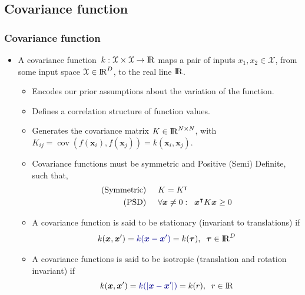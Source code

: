 \documentclass[8pt]{beamer} %
\DeclareMathOperator{\cov}{cov}
\begin{document}
\subsection*{Covariance function}
\begin{frame}
\frametitle{\normalsize Covariance function}

\vspace{-2mm}
\begin{adjustwidth}{-2.5em}{-0.5em}
\begin{itemize}\setlength\itemsep{2mm}
\item[] A covariance function\, $k : \mathcal{X} \times \mathcal{X} \to {\rm I\!R}$ maps a pair of inputs $x_1, x_2 \in \mathcal{X}$, from some input space $\mathcal{X} \in {\rm I\!R}^D$, to the real line ${\rm I\!R}$.\\[1mm]

	\begin{itemize}\setlength\itemsep{3mm}
	\item Encodes our {\color{navyblue} prior assumptions} about the variation of the function.
	
	\item Defines a {\color{navyblue} correlation structure} of function values.

	\item Generates the {\color{navyblue} covariance matrix} $K \in {\rm I\!R}^{N\times N}$, with\, $K_{ij}= \cov(f(\bm{x}_i),f(\bm{x}_j))= k(\bm{x}_i,\bm{x}_j)$.

	\item Covariance functions must be symmetric and Positive (Semi) Definite, such that,
	\begin{align*}
	\text{(Symmetric)}\hspace{5mm} &K = K^\intercal\\
	\text{(PSD)}\hspace{5mm} &\forall \bm{x} \neq 0 : \;\; \bm{x}^\intercal 		K \bm{x} \geq 0
	\end{align*}

	\item A covariance function is said to be {\color{navyblue} stationary} (invariant to translations) if \\[-1mm]%
	$$
	k(\bm{x},\bm{x}')= {\color{navyblue} k(\bm{x}-\bm{x}')}= k(\bm{\tau}), \;\; \bm{\tau} \in {\rm I\!R}^D
	$$

	\item A covariance functions is said to be {\color{navyblue} isotropic} (translation and rotation invariant) if\\[-1mm] %
	$$
	k(\bm{x},\bm{x}') = {\color{navyblue} k(|\bm{x}-\bm{x}'|)} = k(r), \;\; r\in {\rm I\!R}
	$$ 
	

\end{itemize}
\end{itemize}
\end{adjustwidth}
\end{frame}
\end{document}
